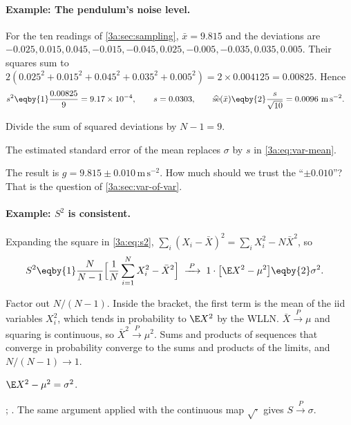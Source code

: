 \paragraph{Example: The pendulum's noise level.}
\label{3a:ex:pendulum-s}
For the ten readings of \cref{3a:sec:sampling}, $\bar x=9.815$ and the
deviations are $-0.025,0.015,0.045,-0.015,-0.045,0.025,-0.005,-0.035,0.035,0.005$.
Their squares sum to
$2(0.025^2+0.015^2+0.045^2+0.035^2+0.005^2)=2\times0.004125=0.00825$. Hence
\begin{align*}
  s^2 &\eqby{1} \frac{0.00825}{9}=9.17\times10^{-4},\qquad s=0.0303,\qquad
  \widehat{\operatorname{se}}(\bar x) \eqby{2} \frac{s}{\sqrt{10}}=0.0096\ \mathrm{m\,s^{-2}} .
\end{align*}
\begin{explain}
  \item Divide the sum of squared deviations by $N-1=9$.
  \item The estimated standard error of the mean replaces $\sigma$ by $s$ in \eqref{3a:eq:var-mean}.
\end{explain}
The result is $g=9.815\pm0.010\,\mathrm{m\,s^{-2}}$. How much should we trust
the ``$\pm0.010$''? That is the question of \cref{3a:sec:var-of-var}.

\paragraph{Example: $S^2$ is consistent.}
\label{3a:ex:s2-consistent}
Expanding the square in \eqref{3a:eq:s2},
$\sum_i(X_i-\bar X)^2=\sum_iX_i^2-N\bar X^2$, so
\begin{align*}
  S^2
  &\eqby{1} \frac{N}{N-1}\Bigl[\frac1N\sum_{i=1}^NX_i^2-\bar X^2\Bigr]
   \;\xrightarrow{\;P\;}\; 1\cdot\bigl[\E X^2-\mu^2\bigr] \eqby{2} \sigma^2 .
\end{align*}
\begin{explain}
  \item Factor out $N/(N-1)$. Inside the bracket, the first term is the mean of
        the iid variables $X_i^2$, which tends in probability to $\E X^2$ by the
        WLLN. $\bar X\xrightarrow{P}\mu$ and squaring is continuous, so
        $\bar X^2\xrightarrow{P}\mu^2$. Sums and products of sequences that
        converge in probability converge to the sums and products of the
        limits, and $N/(N-1)\to1$.
  \item $\E X^2-\mu^2=\sigma^2$.
\end{explain}
; . The same argument
applied with the continuous map $\sqrt{\cdot}$ gives $S\xrightarrow{P}\sigma$.

